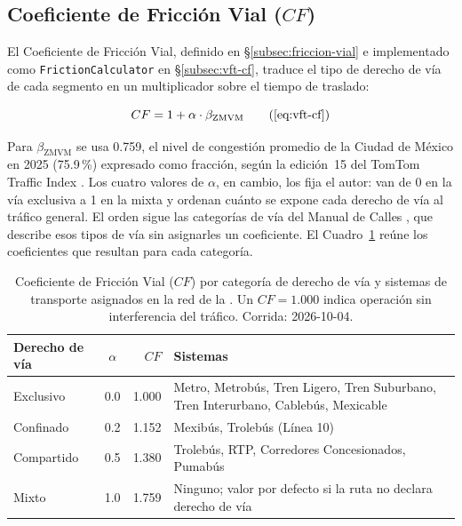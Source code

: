 \subsection{Coeficiente de Fricción Vial (\texorpdfstring{$CF$}{CF})}
\label{subsec:fase2-cf}

El Coeficiente de Fricción Vial, definido en §\ref{subsec:friccion-vial} e
implementado como \texttt{FrictionCalculator} en §\ref{subsec:vft-cf}, traduce
el tipo de derecho de vía de cada segmento en un multiplicador sobre el tiempo
de traslado:

\begin{equation*}
    CF = 1 + \alpha \cdot \beta_{\text{ZMVM}}
    \tag{\ref{eq:vft-cf}}
\end{equation*}

Para $\beta_{\text{ZMVM}}$ se usa 0.759, el nivel de congestión promedio de la
Ciudad de México en 2025 (75.9\,\%) expresado como fracción, según la edición~15
del TomTom Traffic Index \citep{tomtom_traffic_index_2025}. Los cuatro valores
de $\alpha$, en cambio, los fija el autor: van de 0 en la vía exclusiva a 1 en
la mixta y ordenan cuánto se expone cada derecho de vía al tráfico general. El
orden sigue las categorías de vía del Manual de Calles \citep{sedatu2019manual},
que describe esos tipos de vía sin asignarles un coeficiente. El
Cuadro~\ref{tab:cf-derecho-via} reúne los coeficientes que resultan para cada
categoría.

\begin{table}[H]
    \centering
    \caption[Coeficiente de Fricción Vial por categoría de derecho de vía]{%
    Coeficiente de Fricción Vial ($CF$) por categoría de derecho de vía
    y sistemas de transporte asignados en la red de la \zmvm{}.
    Un $CF = 1.000$ indica operación sin interferencia del tráfico.
    Corrida: 2026-10-04.}
    \label{tab:cf-derecho-via}
    \small
    \begin{tabular}{|l|c|r|p{7.6cm}|}
        \hline
        \textbf{Derecho de vía} & \textbf{$\alpha$} &
        \textbf{$CF$} & \textbf{Sistemas} \\
        \hline
        Exclusivo  & 0.0 & 1.000 & Metro, Metrobús, Tren Ligero, Tren Suburbano,
                                   Tren Interurbano, Cablebús, Mexicable \\
        Confinado  & 0.2 & 1.152 & Mexibús, Trolebús (Línea 10) \\
        Compartido & 0.5 & 1.380 & Trolebús, RTP, Corredores Concesionados, Pumabús \\
        Mixto      & 1.0 & 1.759 & Ninguno; valor por defecto si la ruta no
                                   declara derecho de vía \\
        \hline
    \end{tabular}
\end{table}

